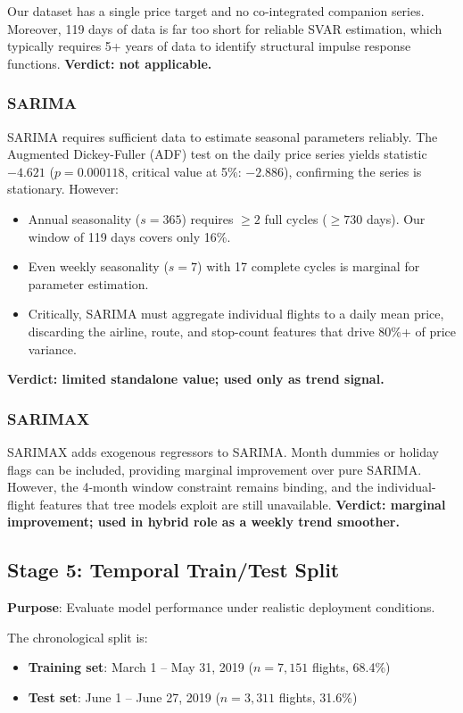 \documentclass[12pt, a4paper]{article}
\begin{document}
Our dataset has a single price target and no co-integrated companion series.
Moreover, 119 days of data is far too short for reliable SVAR estimation,
which typically requires 5+ years of data to identify structural impulse
response functions.  \textbf{Verdict: not applicable.}

\subsubsection{SARIMA}

SARIMA requires sufficient data to estimate seasonal parameters reliably.
The Augmented Dickey-Fuller (ADF) test on the daily price series yields
statistic $-4.621$ ($p = 0.000118$, critical value at 5\%: $-2.886$),
confirming the series is stationary.  However:
\begin{itemize}
    \item Annual seasonality ($s = 365$) requires $\geq 2$ full cycles
    ($\geq 730$ days).  Our window of 119 days covers only 16\%.
    \item Even weekly seasonality ($s = 7$) with 17 complete cycles is
    marginal for parameter estimation.
    \item Critically, SARIMA must aggregate individual flights to a daily
    mean price, discarding the airline, route, and stop-count features
    that drive 80\%+ of price variance.
\end{itemize}
\textbf{Verdict: limited standalone value; used only as trend signal.}

\subsubsection{SARIMAX}

SARIMAX adds exogenous regressors to SARIMA.  Month dummies or holiday flags
can be included, providing marginal improvement over pure SARIMA.  However,
the 4-month window constraint remains binding, and the individual-flight
features that tree models exploit are still unavailable.  \textbf{Verdict:
marginal improvement; used in hybrid role as a weekly trend smoother.}

\subsection{Stage 5: Temporal Train/Test Split}

\textbf{Purpose}: Evaluate model performance under realistic deployment
conditions.

The chronological split is:
\begin{itemize}
    \item \textbf{Training set}: March 1 -- May 31, 2019 ($n = 7{,}151$ flights, 68.4\%)
    \item \textbf{Test set}: June 1 -- June 27, 2019 ($n = 3{,}311$ flights, 31.6\%)
\end{itemize}
\end{document}
